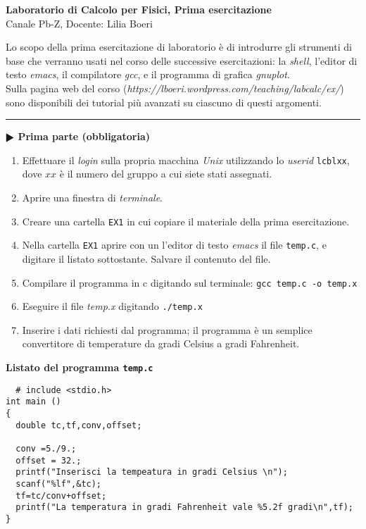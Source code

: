 \documentclass[11pt]{article}
\begin{document}
\pagestyle{empty}

\begin{center}
{\Large \bf  Laboratorio di Calcolo per Fisici, Prima esercitazione\\[2mm]}
{\large Canale Pb-Z, Docente: Lilia Boeri}
\end{center}
\vspace{4mm}

\begin{mdframed}[backgroundcolor=gray!10]
  Lo scopo della prima esercitazione di laboratorio \`e di introdurre gli strumenti di base che verranno usati nel corso delle successive esercitazioni:
  la {\em shell}, l'editor di testo {\em emacs}, il compilatore {\em gcc}, e il
  programma di grafica {\em gnuplot}.
\\
  Sulla pagina web del corso
  ({\em https://lboeri.wordpress.com/teaching/labcalc/ex/})
  sono disponibili dei tutorial pi\`u avanzati su ciascuno di questi argomenti.
\end{mdframed}
%
%

\hrule
\vspace{2mm}
\textbf{$\RHD$ Prima parte (obbligatoria)} 
\begin{enumerate}
\item Effettuare il {\em login} sulla propria macchina {\em Unix} utilizzando lo {\em userid}  \texttt{lcblxx}, dove $xx$ \`e il numero del gruppo a cui siete stati assegnati.
\item Aprire una finestra di {\em terminale}.
\item Creare una cartella  \texttt{EX1} in cui copiare il materiale della prima esercitazione.
\item Nella cartella \texttt{EX1} aprire con un l'editor di testo {\em emacs} il file \texttt{temp.c}, e digitare il listato sottostante. Salvare il contenuto del file.
\item Compilare il programma in c digitando sul terminale:
  \texttt{gcc temp.c -o temp.x}
\item Eseguire il file {\em temp.x} digitando \texttt{./temp.x}
\item Inserire i dati richiesti dal programma; il programma \`e un semplice convertitore di temperature da gradi Celsius a gradi Fahrenheit.
\end{enumerate}

\begin{mdframed}[backgroundcolor=gray!10]
  {\bf Listato del programma \texttt{temp.c}}
  \begin{verbatim}
  # include <stdio.h>
int main ()
{
  double tc,tf,conv,offset;

  conv =5./9.;
  offset = 32.;
  printf("Inserisci la tempeatura in gradi Celsius \n");
  scanf("%lf",&tc);
  tf=tc/conv+offset;
  printf("La temperatura in gradi Fahrenheit vale %5.2f gradi\n",tf);
}
\end{verbatim}
\end{mdframed}
\end{document}
